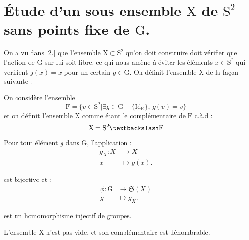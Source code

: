 \section{Étude d'un sous ensemble $\mathrm{X}$ de $\mathrm{S}^2$ sans points fixe de $\mathrm{G}$.}
On a vu dans \ref{2.} que l'ensemble $\mathrm{X} \subset \mathrm{S}^2$ qu'on doit construire doit vérifier que l'action de $\mathrm{G}$ sur lui soit libre, ce qui nous amène à éviter les éléments $x\in  \mathrm{S}^2$ qui verifient $g(x) = x$ pour un certain $g \in \mathrm{G}$. On définit l'ensemble $\mathrm{X}$ de la façon suivante :
\begin{definition}
  On considère l'ensemble $$\mathrm{F}=\{v \in \mathrm{S}^2 | \exists g \in \mathrm{G}-\{\mathrm{Id_E}\}\text{, } g(v)=v\}$$ et on définit l'ensemble $\mathrm{X}$ comme étant le complémentaire de $\mathrm{F}$ c.à.d : $$\mathrm{X} = \mathrm{S}^2 \textbackslash \mathrm{F}$$
\end{definition}
\begin{prop}\label{prop6}
  \hfill

  Pour tout élément $g$ dans $\mathrm{G}$, l'application :
  \begin{align*}
 g_X \colon X &\to X\\
 x &\mapsto g(x).
\end{align*}\par
est bijective et :
  \begin{align*}
  \phi \colon \mathrm{G} &\to \mathfrak{S}(X)\\
  g &\mapsto g_X.
\end{align*}\par
est un homomorphisme injectif de groupes.
\end{prop}
\begin{lemma}\label{lemme10}
  L'ensemble $\mathrm{X}$ n'est pas vide, et son complémentaire est dénombrable.
\end{lemma}
